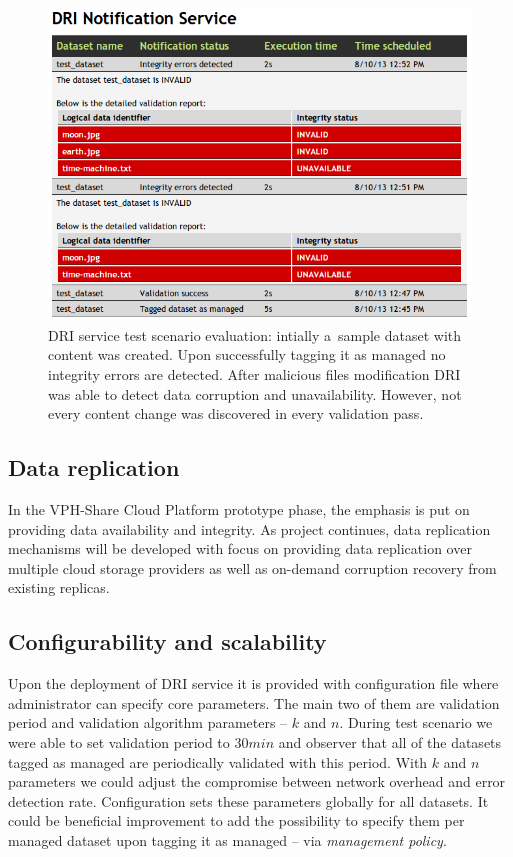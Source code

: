 \begin{figure}[h!]
	\centering
	\includegraphics[width=\textwidth]{images/test-scenario-results.png}
	\caption{DRI service test scenario evaluation: intially a~sample dataset with content
	was created. Upon successfully tagging it as managed no integrity errors are detected.
	After malicious files modification DRI was able to detect data corruption and unavailability.
	However, not every content change was discovered in every validation pass.}
	\label{fig:test-scenario-results}
\end{figure}


\subsection{Data replication}
In the VPH-Share Cloud Platform prototype phase, the emphasis is put on providing data
availability and integrity. As project continues, data replication mechanisms will be developed
with focus on providing data replication over multiple cloud storage providers as well as on-demand
corruption recovery from existing replicas.

\subsection{Configurability and scalability}
Upon the deployment of DRI service it is provided with configuration file where administrator
can specify core parameters. The main two of them are validation period and validation algorithm
parameters -- $k$ and $n$. During test scenario we were able to set validation period to $30 min$
and observer that all of the datasets tagged as managed are periodically validated with this period.
With $k$ and $n$ parameters we could adjust the compromise between network overhead and
error detection rate. Configuration sets these parameters globally for all datasets. It could be
beneficial improvement to add the possibility to specify them per managed dataset upon tagging it
as managed -- via \textit{management policy}.



